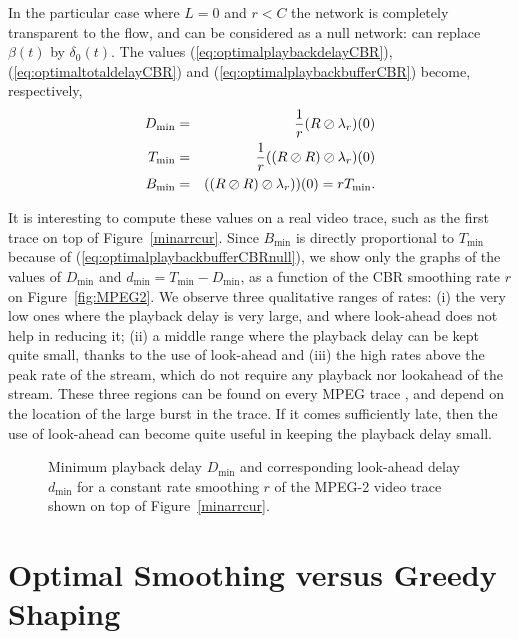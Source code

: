 In the particular case  where $L = 0$ and $r < C$ the network is completely transparent to the flow,
and can be considered as a null network: can replace $\beta(t)$ by $ \delta_0(t)$. The values
(\ref{eq:optimalplaybackdelayCBR}), (\ref{eq:optimaltotaldelayCBR}) and (\ref{eq:optimalplaybackbufferCBR}) become,
respectively,
\begin{eqnarray}
\mylabel{eq:optimalplaybackdelayCBRnull}
D_{\min} & = & \frac{1}{r} (R \oslash \lambda_r)(0) \\
\mylabel{eq:optimaltotaldelayCBRnull}
T_{\min} & = & \frac{1}{r} ((R \oslash R)  \oslash \lambda_r)(0) \\
\mylabel{eq:optimalplaybackbufferCBRnull}
B_{\min} & = & ((R \oslash R) \oslash \lambda_r))(0) = rT_{\min}.
\end{eqnarray}

It is interesting to compute these values on a real video trace, such as the first trace on top of Figure~\ref{minarrcur}. Since $B_{\min}$ is directly proportional to $T_{\min}$ because of (\ref{eq:optimalplaybackbufferCBRnull}), we
show only the graphs of the values of $D_{\min}$ and $d_{\min} = T_{\min} - D_{\min}$, as a function of the CBR smoothing rate $r$ on Figure~\ref{fig:MPEG2}. We observe three qualitative ranges
of rates: (i) the very low ones where the playback delay is very large, and where look-ahead does not help
in reducing it; %
(ii) a middle range where the playback delay can be kept quite small, thanks to the use
of look-ahead and (iii) the high rates above the peak rate of the stream, which do not require any playback nor lookahead of the stream. These three regions can be found on every MPEG trace \cite{thilebworm2001}, and depend on the location of the large burst in the trace. If it comes sufficiently late, then the use of look-ahead can become quite useful in keeping the playback delay small.

\begin{figure}[h!]
\caption{Minimum playback delay  $D_{\min}$ and corresponding look-ahead delay
$d_{\min}$ for a constant rate smoothing $r$ of the MPEG-2 video trace shown on top of Figure~\ref{minarrcur}. }
\protect{}
\end{figure}

\section{Optimal Smoothing versus Greedy Shaping}

